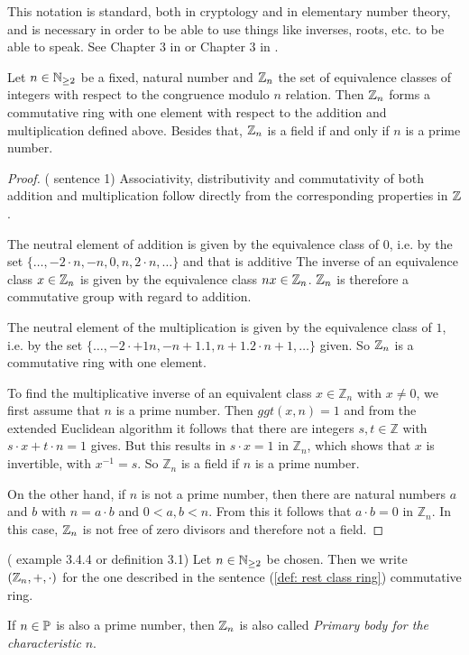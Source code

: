 This notation is standard, both in cryptology and in elementary number theory, and is necessary in order to be able to use things like inverses, roots, etc. to be able to speak. See Chapter 3 in \cite{JB} or Chapter 3 in \cite{AL}.

\begin{theorem}
\label{def: residual class ring}
Let $ n \in \mathbb{N} _{\geq 2} $ be a fixed, natural number and
$ \mathbb{Z}_n $ the set of equivalence classes of integers with respect to the  congruence modulo $ n $ relation. Then $ \mathbb{Z}_n $ forms a commutative ring with one element with respect to the addition and multiplication defined above. Besides that, $\mathbb{Z}_n $ is a field if and only if $ n $ is a prime number.
\end{theorem}
\begin{proof} (\cite{AL} sentence 1) Associativity, distributivity and commutativity of both addition and multiplication follow directly from the corresponding properties in $ \mathbb{Z} $.

The neutral element of addition is given by the equivalence class of $ 0 $, i.e. by the set $ \{\ldots, -2 \cdot n, -n, 0, n, 2 \cdot n, \ldots \} $ and that is additive The inverse of an equivalence class $ x \in \mathbb{Z}_n $ is given by the equivalence class $ nx \in \mathbb{Z}_n $. $ \mathbb{Z}_n $ is therefore a commutative group with regard to addition.

The neutral element of the multiplication is given by the equivalence class of $ 1 $, i.e. by the set $ \{\ldots, -2 \cdot + 1 n, -n + 1.1, n + 1.2 \cdot n + 1, \ldots \} $ given. So $ \mathbb{Z}_n $ is a commutative ring with one element.

To find the multiplicative inverse of an equivalent class $ x \in \mathbb{Z} _n $ with $ x \neq 0 $, we first assume that $ n $ is a prime number. Then $ ggt (x, n) = 1 $ and from the extended Euclidean algorithm it follows that there are integers $ s, t \in \mathbb{Z} $ with $ s \cdot x + t \cdot n = 1 $ gives. But this results in $ s \cdot x = 1 $ in $ \mathbb{Z} _n $, which shows that $ x $ is invertible, with $ x ^{- 1} = s $. So $ \mathbb{Z} _n $ is a field if $ n $ is a prime number.

On the other hand, if $ n $ is not a prime number, then there are natural numbers $ a $ and $ b $ with $ n = a \cdot b $ and $ 0 <a, b <n $. From this it follows that $ a \cdot b = 0 $ in $ \mathbb{Z} _n $. In this case, $ \mathbb{Z}_n $ is not free of zero divisors and therefore not a field.
\end{proof}
\begin{definition}  (\cite{JB} example 3.4.4 or \cite{AL} definition 3.1)
Let $ n \in \mathbb{N} _{\geq 2} $ be chosen. Then we write $ (\mathbb{Z}_n, +, \cdot) $ for the one described in the sentence (\ref{def: rest class ring}) commutative ring.

If $ n \in \mathbb{P} $ is also a prime number, then $ \mathbb{Z}_n $ is also called
\textit{Primary body for the characteristic} $ n $.
\end{definition}
